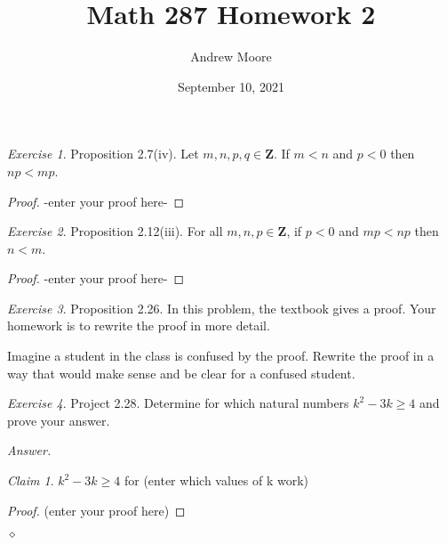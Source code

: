 \documentclass[12pt,oneside]{amsart}
\title{Math 287 Homework 2}
\author{Andrew Moore}
\date{September 10, 2021} %
\theoremstyle{remark}
\newtheorem{exer}{Exercise}
\newtheorem{claim}{Claim}[exer]
\newcommand{\bfZ}{\mathbf{Z}}
\newenvironment{answer}{\bigskip\noindent\emph{Answer.}}{\hfill$\diamond$\newline}
\begin{document}
\maketitle

\newpage
\begin{exer}
Proposition 2.7(iv). Let $m,n,p,q \in \bfZ$.
If $m < n$ and $p < 0$ then $np < mp$.
\end{exer}

\begin{proof}
-enter your proof here-
\end{proof}


\newpage
\begin{exer}
Proposition 2.12(iii). For all $m,n,p \in \bfZ$,
if $p < 0$ and $mp < np$ then $n < m$.
\end{exer}

\begin{proof}
-enter your proof here-
\end{proof}

\newpage
\begin{exer}
Proposition 2.26. In this problem, the textbook gives a proof. Your homework is to rewrite the proof in more detail.

Imagine a student in the class is confused by the proof. Rewrite the proof in a way that would make sense and be clear for a confused student.
\end{exer}

\newpage
\begin{exer}
Project 2.28. Determine for which natural numbers $k^2 - 3k \geq 4$
and prove your answer.
\end{exer}

\begin{answer}
\begin{claim}
$k^2 - 3k \geq 4$ for (enter which values of k work)
\end{claim}

\begin{proof}
(enter your proof here)
\end{proof}
\end{answer}
\end{document}
